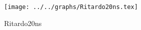 \begin{figure}[h] \centering \texttt{[image: ../../graphs/Ritardo20ns.tex]}\caption{Ritardo20ns}\label{gr:Ritardo20ns} \end{figure}
